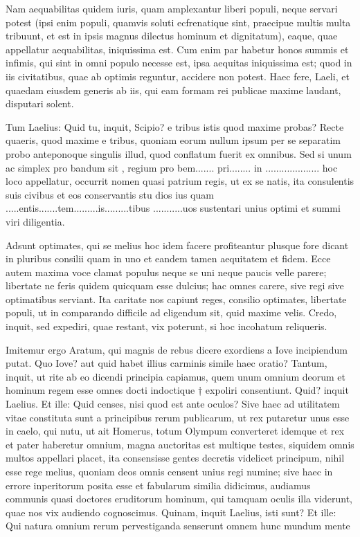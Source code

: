  Nam aequabilitas quidem iuris, quam amplexantur liberi populi, neque servari potest (ipsi enim populi, quamvis soluti ecfrenatique sint, praecipue multis multa tribuunt, et est in ipsis magnus dilectus hominum et dignitatum), eaque, quae appellatur aequabilitas, iniquissima est. Cum enim par habetur honos summis et infimis, qui sint in omni populo necesse est, ipsa aequitas iniquissima est; quod in iis civitatibus, quae ab optimis reguntur, accidere non potest. Haec fere, Laeli, et quaedam eiusdem generis ab iis, qui eam formam rei publicae maxime laudant, disputari solent.

 Tum Laelius: Quid tu, inquit, Scipio? e tribus istis quod maxime probas? Recte quaeris, quod maxime e tribus, quoniam eorum nullum ipsum per se separatim probo anteponoque singulis illud, quod conflatum fuerit ex omnibus. Sed si unum ac simplex pro bandum sit , regium pro bem....... pri........ in .................... hoc loco appellatur, occurrit nomen quasi patrium regis, ut ex se natis, ita consulentis suis civibus et eos conservantis stu dios ius quam .....entis.......tem.........is.........tibus ...........uos sustentari unius optimi et summi viri diligentia.

 Adsunt optimates, qui se melius hoc idem facere profiteantur plusque fore dicant in pluribus consilii quam in uno et eandem tamen aequitatem et fidem. Ecce autem maxima voce clamat populus neque se uni neque paucis velle parere; libertate ne feris quidem quicquam esse dulcius; hac omnes carere, sive regi sive optimatibus serviant. Ita caritate nos capiunt reges, consilio optimates, libertate populi, ut in comparando difficile ad eligendum sit, quid maxime velis. Credo, inquit, sed expediri, quae restant, vix poterunt, si hoc incohatum reliqueris.

 Imitemur ergo Aratum, qui magnis de rebus dicere exordiens a Iove incipiendum putat. Quo Iove? aut quid habet illius carminis simile haec oratio? Tantum, inquit, ut rite ab eo dicendi principia capiamus, quem unum omnium deorum et hominum regem esse omnes docti indoctique † expoliri consentiunt. Quid? inquit Laelius. Et ille: Quid censes, nisi quod est ante oculos? Sive haec ad utilitatem vitae constituta sunt a principibus rerum publicarum, ut rex putaretur unus esse in caelo, qui nutu, ut ait Homerus, totum Olympum converteret idemque et rex et pater haberetur omnium, magna auctoritas est multique testes, siquidem omnis multos appellari placet, ita consensisse gentes decretis videlicet principum, nihil esse rege melius, quoniam deos omnis censent unius regi numine; sive haec in errore inperitorum posita esse et fabularum similia didicimus, audiamus communis quasi doctores eruditorum hominum, qui tamquam oculis illa viderunt, quae nos vix audiendo cognoscimus. Quinam, inquit Laelius, isti sunt? Et ille: Qui natura omnium rerum pervestiganda senserunt omnem hunc mundum mente

